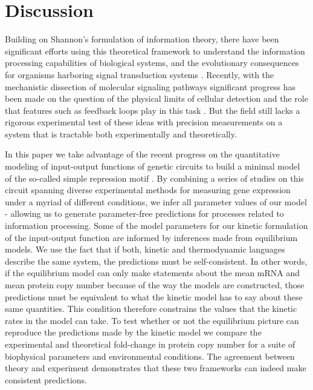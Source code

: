 \section*{Discussion}

Building on Shannon's formulation of information theory, there have been
significant efforts using this theoretical framework to understand the
information processing capabilities of biological systems, and the evolutionary
consequences for organisms harboring signal transduction systems
\cite{Bergstrom2004, Taylor2007, Tkacik2008, Polani2009, Nemenman2010,
Rivoire2011}. Recently, with the mechanistic dissection of molecular signaling
pathways significant progress has been made on the question of the physical
limits of cellular detection and the role that features such as feedback loops
play in this task \cite{Bialek2005, Libby2007, Tkacik2011, Rhee2012a,
Voliotis2014a}. But the field still lacks a rigorous experimental test of these
ideas with precision measurements on a system that is tractable both
experimentally and theoretically.

In this paper we take advantage of the recent progress on the quantitative
modeling of input-output functions of genetic circuits to build a minimal model
of the so-called simple repression motif \cite{Phillips2019}. By combining a
series of studies on this circuit spanning diverse experimental methods for
measuring gene expression under a myriad of different conditions, we infer all
parameter values of our model - allowing us to generate parameter-free
predictions for processes related to information processing. Some of the model
parameters for our kinetic formulation of the input-output function are informed
by inferences made from equilibrium models. We use the fact that if both,
kinetic and thermodynamic languages describe the same system, the predictions
must be self-consistent. In other words, if the equilibrium model can only make
statements about the mean mRNA and mean protein copy number because of the way
the models are constructed, those predictions must be equivalent to what the
kinetic model has to say about these same quantities. This condition therefore
constrains the values that the kinetic rates in the model can take. To test
whether or not the equilibrium picture can reproduce the predictions made by the
kinetic model we compare the experimental and theoretical fold-change in protein
copy number for a suite of biophysical parameters and environmental conditions.
The agreement between theory and experiment demonstrates that these two
frameworks can indeed make consistent predictions.

